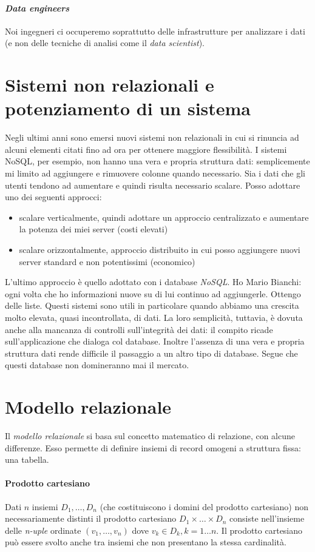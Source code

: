 \paragraph{\emph{Data engineers}} Noi ingegneri ci occuperemo soprattutto delle infrastrutture per analizzare i dati (e non delle tecniche di analisi come il \emph{data scientist}).

\section{Sistemi non relazionali e potenziamento di un sistema} Negli ultimi anni sono emersi nuovi sistemi non relazionali in cui si rinuncia ad alcuni elementi citati fino ad ora per ottenere maggiore flessibilità. I sistemi NoSQL, per esempio, non hanno una vera e propria struttura dati: semplicemente mi limito ad aggiungere e rimuovere colonne quando necessario. Sia i dati che gli utenti tendono ad aumentare e quindi risulta necessario scalare. Posso adottare uno dei seguenti approcci:
\begin{itemize}
	\item scalare verticalmente, quindi adottare un approccio centralizzato e aumentare la potenza dei miei server (costi elevati)
	\item scalare orizzontalmente, approccio distribuito in cui posso aggiungere nuovi server standard e non potentissimi (economico)
\end{itemize} 
L'ultimo approccio è quello adottato con i database \emph{NoSQL}. Ho Mario Bianchi: ogni volta che ho informazioni nuove su di lui continuo ad aggiungerle. Ottengo delle liste. Questi sistemi sono utili in particolare quando abbiamo una crescita molto elevata, quasi incontrollata, di dati. La loro semplicità, tuttavia, è dovuta anche alla mancanza di controlli sull'integrità dei dati: il compito ricade sull'applicazione che dialoga col database.  Inoltre l'assenza di una vera e propria struttura dati rende difficile il passaggio a un altro tipo di database. Segue che questi database non domineranno mai il mercato.
\pagebreak

\section{Modello relazionale}
Il \emph{modello relazionale} si basa sul concetto matematico di relazione, con alcune differenze. Esso permette di definire insiemi di record omogeni a struttura fissa: una tabella.
\paragraph{Prodotto cartesiano}
Dati $n$ insiemi $D_1,\dots,D_n$ (che costituiscono i domini del prodotto cartesiano) non necessariamente distinti il prodotto cartesiano $D_1 \times \dots \times D_n$ consiste nell'insieme delle \emph{n-uple} ordinate $(v_1,\dots,v_n)$ dove $v_k \in D_k, k=1\dots n$. Il prodotto cartesiano può essere svolto anche tra insiemi che non presentano la stessa cardinalità.
